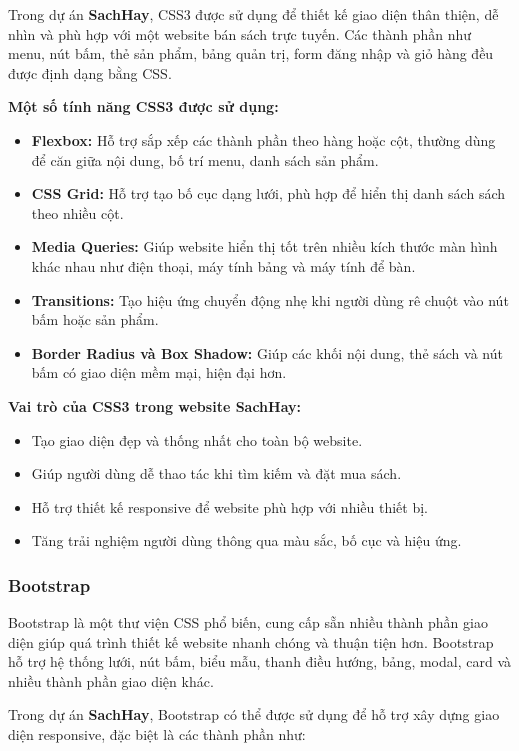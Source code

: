 Trong dự án \textbf{SachHay}, CSS3 được sử dụng để thiết kế giao diện thân thiện, dễ nhìn và phù hợp với một website bán sách trực tuyến. Các thành phần như menu, nút bấm, thẻ sản phẩm, bảng quản trị, form đăng nhập và giỏ hàng đều được định dạng bằng CSS.

\textbf{Một số tính năng CSS3 được sử dụng:}

\begin{itemize}
	\item \textbf{Flexbox:} Hỗ trợ sắp xếp các thành phần theo hàng hoặc cột, thường dùng để căn giữa nội dung, bố trí menu, danh sách sản phẩm.
	\item \textbf{CSS Grid:} Hỗ trợ tạo bố cục dạng lưới, phù hợp để hiển thị danh sách sách theo nhiều cột.
	\item \textbf{Media Queries:} Giúp website hiển thị tốt trên nhiều kích thước màn hình khác nhau như điện thoại, máy tính bảng và máy tính để bàn.
	\item \textbf{Transitions:} Tạo hiệu ứng chuyển động nhẹ khi người dùng rê chuột vào nút bấm hoặc sản phẩm.
	\item \textbf{Border Radius và Box Shadow:} Giúp các khối nội dung, thẻ sách và nút bấm có giao diện mềm mại, hiện đại hơn.
\end{itemize}

\textbf{Vai trò của CSS3 trong website SachHay:}

\begin{itemize}
	\item Tạo giao diện đẹp và thống nhất cho toàn bộ website.
	\item Giúp người dùng dễ thao tác khi tìm kiếm và đặt mua sách.
	\item Hỗ trợ thiết kế responsive để website phù hợp với nhiều thiết bị.
	\item Tăng trải nghiệm người dùng thông qua màu sắc, bố cục và hiệu ứng.
\end{itemize}

\subsubsection{Bootstrap}

Bootstrap là một thư viện CSS phổ biến, cung cấp sẵn nhiều thành phần giao diện giúp quá trình thiết kế website nhanh chóng và thuận tiện hơn. Bootstrap hỗ trợ hệ thống lưới, nút bấm, biểu mẫu, thanh điều hướng, bảng, modal, card và nhiều thành phần giao diện khác.

Trong dự án \textbf{SachHay}, Bootstrap có thể được sử dụng để hỗ trợ xây dựng giao diện responsive, đặc biệt là các thành phần như:

